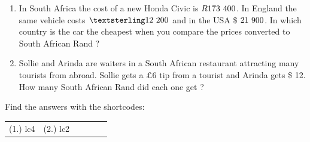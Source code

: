 \begin{enumerate}[noitemsep, label=\textbf{\arabic*}. ]
{        }%
      
    \par
  \label{m39335*id68888}\begin{enumerate}[noitemsep, label=\textbf{\alph*}. ] 
            \label{m39335*uid26}\item In South Africa the cost of a new Honda Civic is \begin{math}R173\phantom{\rule{3.33333pt}{0ex}}400\end{math}. In England the same vehicle costs \begin{math}£12\phantom{\rule{3.33333pt}{0ex}}200\end{math} and in the USA \$ \begin{math}21\phantom{\rule{3.33333pt}{0ex}}900\end{math}. In which country is the car the cheapest when you compare the prices converted to South African Rand ?
\label{m39335*uid27}\item Sollie and Arinda are waiters in a South African restaurant attracting many tourists from abroad. Sollie gets a \begin{math}£6\end{math} tip from a tourist and Arinda gets \$ 12.
How many South African Rand did each one get ?
\end{enumerate}
        
        \end{enumerate}
        
        

    \label{m39335*cid7}
\par {} Find the answers with the shortcodes:
 \par \begin{tabular}[h]{cccccc}
 (1.) lc4  &  (2.) lc2  & \end{tabular}



